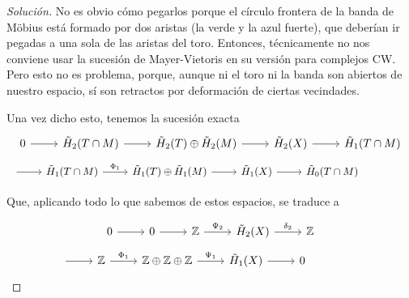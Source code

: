 \documentclass[spanish]{book}
\theoremstyle{definition}
\newcommand{\Z}{\mathbb{Z}}
\begin{document}
\begin{proof}[Solución]
	No es obvio cómo pegarlos porque el círculo frontera de la banda de Möbius está formado por dos aristas (la verde y la azul fuerte), que deberían ir pegadas a una sola de las aristas del toro. Entonces, técnicamente no nos conviene usar la sucesión de Mayer-Vietoris en su versión para complejos CW. Pero esto no es problema, porque, aunque ni el toro ni la banda son abiertos de nuestro espacio, sí son retractos por deformación de ciertas vecindades.
	
	Una vez dicho esto, tenemos la sucesión exacta
	\[\begin{tikzcd}
		0 \arrow[r] & \tilde{H}_2(T\cap M) \arrow[r] & \tilde{H}_2(T)\oplus \tilde{H}_2(M) \arrow[r] & \tilde{H}_2(X) \arrow[r] & \tilde{H}_1(T\cap M)
	\end{tikzcd}\]
	\[\begin{tikzcd}
		\arrow[r]&\tilde{H}_1(T\cap M) \arrow[r,"\Phi_1"] &\tilde{H}_1(T)\oplus \tilde{H}_1(M) \arrow[r] & \tilde{H}_1(X) \arrow[r] & \tilde{H}_0(T\cap M)&&
	\end{tikzcd}\]
	
	Que, aplicando todo lo que sabemos de estos espacios, se traduce a
	
		\[\begin{tikzcd}
		0 \arrow[r] & 0 \arrow[r] & \Z \arrow[r,"\Psi_2"] & \tilde{H}_2(X) \arrow[r,"\delta_2"] & \Z
	\end{tikzcd}\]
	\[\begin{tikzcd}
		\arrow[r]&\Z \arrow[r,"\Phi_1"] &\Z\oplus \Z \oplus\Z \arrow[r,"\Psi_1"] & \tilde{H}_1(X) \arrow[r] & 0&&
	\end{tikzcd}\]
	
	

\end{proof}
\end{document}
